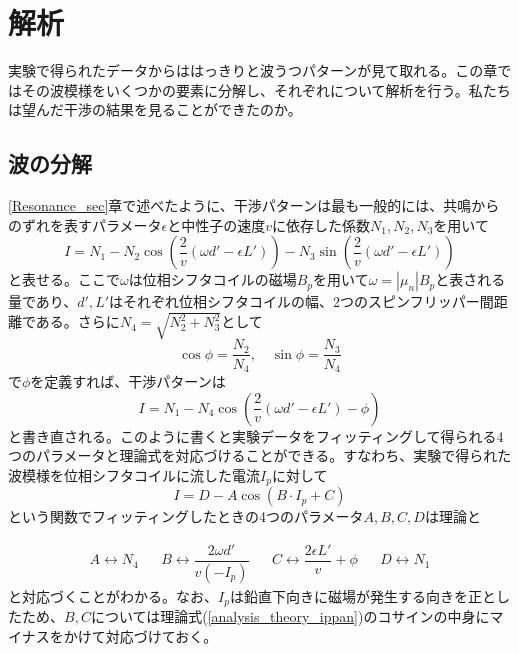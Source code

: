 \section{解析}
実験で得られたデータからははっきりと波うつパターンが見て取れる。この章ではその波模様をいくつかの要素に分解し、それぞれについて解析を行う。私たちは望んだ干渉の結果を見ることができたのか。

\subsection{波の分解}

\ref{Resonance_sec}章で述べたように、干渉パターンは最も一般的には、共鳴からのずれを表すパラメータ$\epsilon$と中性子の速度$v$に依存した係数$N_1,N_2,N_3$を用いて
\begin{equation}
I=N_1-N_2\cos\left(\frac{2}{v}(\omega d'-\epsilon L')\right) -N_3\sin\left(\frac{2}{v}(\omega d'-\epsilon L')\right) \label{analysis_theory_ippan}
\end{equation}
と表せる。ここで$\omega$は位相シフタコイルの磁場$B_p$を用いて$\omega=|\mu_n|B_p$と表される量であり、$d',L'$はそれぞれ位相シフタコイルの幅、2つのスピンフリッパー間距離である。さらに$N_4=\sqrt{N_2^2+N_3^2}$として
\begin{equation}
\cos \phi=\frac{N_2}{N_4}, \quad \sin \phi=\frac{N_3}{N_4}
\end{equation}
で$\phi$を定義すれば、干渉パターンは
\begin{equation}
I=N_1-N_4\cos\left(\frac{2}{v}(\omega d'-\epsilon L')-\phi\right)\label{analysis_theory_ippan2}
\end{equation}
と書き直される。このように書くと実験データをフィッティングして得られる4つのパラメータと理論式を対応づけることができる。すなわち、実験で得られた波模様を位相シフタコイルに流した電流$I_p$に対して
\begin{equation}
I=D-A\cos(B\cdot I_p+C)
\end{equation}
という関数でフィッティングしたときの4つのパラメータ$A,B,C,D$は理論と

\begin{align}
A \leftrightarrow N_4&&B \leftrightarrow \dfrac{2\omega d'}{v(-I_p)}&&C \leftrightarrow \dfrac{2\epsilon L'}{v} +\phi&&D \leftrightarrow N_1
\end{align}
と対応づくことがわかる。なお、$I_p$は鉛直下向きに磁場が発生する向きを正としたため、$B,C$については理論式(\ref{analysis_theory_ippan})のコサインの中身にマイナスをかけて対応づけておく。

